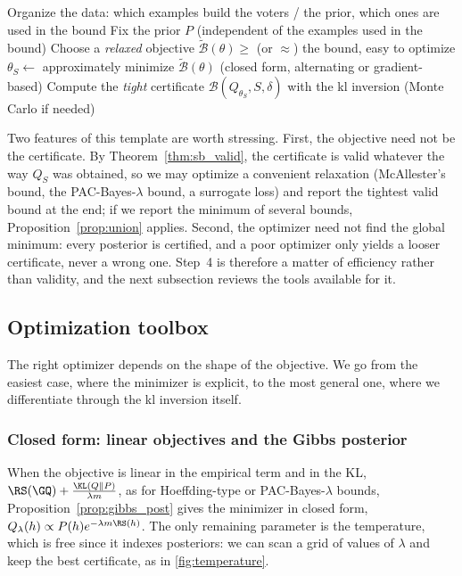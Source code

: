 \begin{algorithm}[h]
\caption{Generic self-bounding learning}\label{algo:sb_template}
Organize the data: which examples build the voters / the prior, which ones are used in the bound\;
Fix the prior $P$ (independent of the examples used in the bound)\;
Choose a \emph{relaxed} objective $\widetilde{\mathcal B}(\theta)\geq$ (or $\approx$) the bound, easy to optimize\;
$\theta_S\leftarrow$ approximately minimize $\widetilde{\mathcal B}(\theta)$ (closed form, alternating or gradient-based)\;
Compute the \emph{tight} certificate $\mathcal B(Q_{\theta_S},S,\delta)$ with the kl inversion (Monte Carlo if needed)\;
\end{algorithm}

Two features of this template are worth stressing. First, the objective need
not be the certificate. By Theorem~\ref{thm:sb_valid}, the certificate is valid
whatever the way $Q_S$ was obtained, so we may optimize a convenient relaxation
(McAllester's bound, the PAC-Bayes-$\lambda$ bound, a surrogate loss) and report
the tightest valid bound at the end; if we report the minimum of several bounds,
Proposition~\ref{prop:union} applies. Second, the optimizer need not find the
global minimum: every posterior is certified, and a poor optimizer only yields
a looser certificate, never a wrong one. Step~4 is therefore a matter of
efficiency rather than validity, and the next subsection reviews the tools
available for it.

\subsection{Optimization toolbox}\label{sec:sb_optim}

The right optimizer depends on the shape of the objective. We go from the
easiest case, where the minimizer is explicit, to the most general one, where
we differentiate through the kl inversion itself.

\subsubsection{Closed form: linear objectives and the Gibbs posterior}

When the objective is linear in the empirical term and in the KL,
$\RS(\GQ)+\frac{\KL(Q\|P)}{\lambda m}$, as for Hoeffding-type or PAC-Bayes-$\lambda$
bounds, Proposition~\ref{prop:gibbs_post} gives the minimizer in closed form,
$Q_\lambda(h)\propto P(h)e^{-\lambda m\RS(h)}$. The only remaining parameter is the
temperature, which is free since it indexes posteriors: we can scan a grid of
values of $\lambda$ and keep the best certificate, as in \cref{fig:temperature}.

